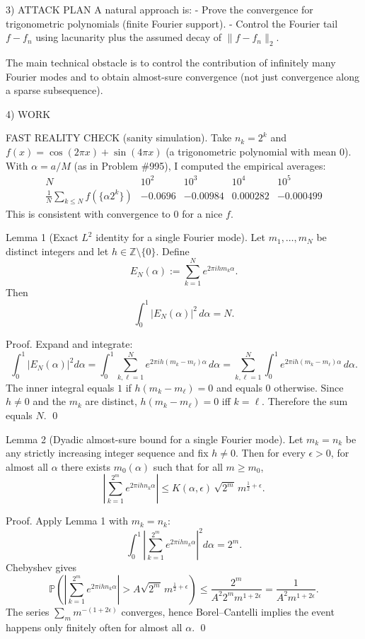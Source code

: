 3) ATTACK PLAN
A natural approach is:
- Prove the convergence for trigonometric polynomials (finite Fourier support).
- Control the Fourier tail $f-f_n$ using lacunarity plus the assumed decay of $\|f-f_n\|_2$.

The main technical obstacle is to control the contribution of infinitely many Fourier modes and to obtain almost-sure convergence (not just convergence along a sparse subsequence).

4) WORK

FAST REALITY CHECK (sanity simulation).
Take $n_k=2^k$ and $f(x)=\cos(2\pi x)+\sin(4\pi x)$ (a trigonometric polynomial with mean $0$).  With $\alpha=a/M$ (as in Problem \#995), I computed the empirical averages:
\[
\begin{array}{c|cccc}
 N & 10^2 & 10^3 & 10^4 & 10^5\\\hline
 \frac1N\sum_{k\le N} f(\{\alpha 2^k\}) & -0.0696 & -0.00984 & 0.000282 & -0.000499
\end{array}
\]
This is consistent with convergence to $0$ for a nice $f$.

Lemma 1 (Exact $L^2$ identity for a single Fourier mode).
Let $m_1,\dots,m_N$ be distinct integers and let $h\in\mathbb{Z}\setminus\{0\}$.  Define
\[
E_N(\alpha):=\sum_{k=1}^N e^{2\pi i h m_k \alpha}.
\]
Then
\[
\int_0^1 |E_N(\alpha)|^2\,d\alpha = N.
\]

Proof.
Expand and integrate:
\[
\int_0^1 |E_N(\alpha)|^2 d\alpha
=\int_0^1 \sum_{k,\ell=1}^N e^{2\pi i h(m_k-m_\ell)\alpha}\,d\alpha
=\sum_{k,\ell=1}^N \int_0^1 e^{2\pi i h(m_k-m_\ell)\alpha}\,d\alpha.
\]
The inner integral equals $1$ if $h(m_k-m_\ell)=0$ and equals $0$ otherwise.  Since $h\neq 0$ and the $m_k$ are distinct, $h(m_k-m_\ell)=0$ iff $k=\ell$.  Therefore the sum equals $N$. \qed

Lemma 2 (Dyadic almost-sure bound for a single Fourier mode).
Let $m_k=n_k$ be any strictly increasing integer sequence and fix $h\neq 0$.  Then for every $\epsilon>0$, for almost all $\alpha$ there exists $m_0(\alpha)$ such that for all $m\ge m_0$,
\[
\left|\sum_{k=1}^{2^m} e^{2\pi i h n_k\alpha}\right| \le K(\alpha,\epsilon)\,\sqrt{2^m}\,m^{\frac12+\epsilon}.
\]

Proof.
Apply Lemma 1 with $m_k=n_k$:
\[
\int_0^1 \left|\sum_{k=1}^{2^m} e^{2\pi i h n_k\alpha}\right|^2 d\alpha = 2^m.
\]
Chebyshev gives
\[
\mathbb{P}\left(\left|\sum_{k=1}^{2^m} e^{2\pi i h n_k\alpha}\right|>A\sqrt{2^m}\,m^{\frac12+\epsilon}\right)
\le \frac{2^m}{A^2 2^m m^{1+2\epsilon}}=\frac{1}{A^2 m^{1+2\epsilon}}.
\]
The series $\sum_m m^{-(1+2\epsilon)}$ converges, hence Borel--Cantelli implies the event happens only finitely often for almost all $\alpha$. \qed

